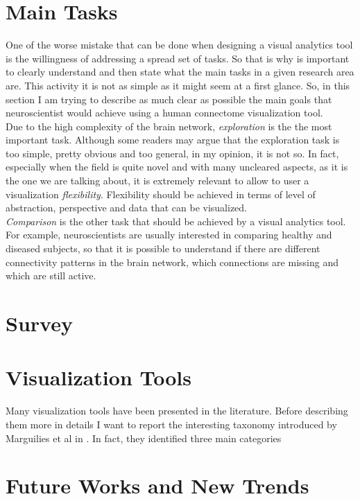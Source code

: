\documentclass{article}
\begin{document}
\begin{multicols}{2}
\section{Main Tasks}
One of the worse mistake that can be done when designing a visual analytics tool is the willingness of addressing a spread set of tasks. So that is why is important to clearly understand and then state what the main tasks in a given research area are. This activity it is not as simple as it might seem at a first glance. So, in this section I am trying to describe as much clear as possible the main goals that neuroscientist would achieve using a human connectome visualization tool.\\
Due to the high complexity of the brain network, \textit{exploration} is the the most important task. Although some readers may argue that the exploration task is too simple, pretty obvious and too general, in my opinion, it is not so. In fact, especially when the field is quite novel and with many uncleared aspects, as it is the one we are talking about, it is extremely relevant to allow to user a visualization \textit{flexibility}. Flexibility should be achieved in terms of level of abstraction, perspective and data that can be visualized. \\
\textit{Comparison} is the other task that should be achieved by a visual analytics tool. For example, neuroscientists are usually interested in comparing healthy and diseased subjects, so that it is possible to understand if there are different connectivity patterns in the brain network, which connections are missing and which are still active. 

\section{Survey}
\section{Visualization Tools}
Many visualization tools have been presented in the literature. Before describing them more in details I want to report the interesting taxonomy introduced by Marguilies et al in \cite{visualizingHumanConnectome}. In fact, they identified three main categories 

\section{Future Works and New Trends}


{}
  





\end{multicols}
\end{document}
